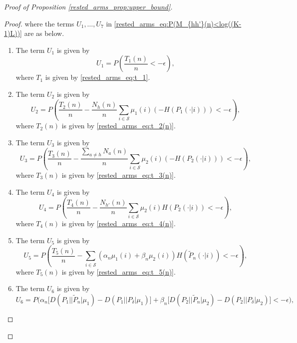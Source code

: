 \begin{proof}[Proof of Proposition \ref{rested_arms_prop:upper_bound}]
\begin{proof}
where the terms $U_1,\ldots,U_7$ in \eqref{rested_arms_eq:P(M_{hh'}(n)<log((K-1)L))} are as below.
\begin{enumerate}
	\item The term $U_1$ is given by
	\begin{equation}
		U_1=P\left(\frac{T_1(n)}{n}<-\epsilon\right)\label{rested_arms_eq:exp_bound_t_1/n},
	\end{equation}
	where $T_1$ is given by \eqref{rested_arms_eq:t_1}.
	\item The term $U_2$ is given by
	\begin{equation}
		U_2=P\left(\frac{T_2(n)}{n}-\frac{N_h(n)}{n}\sum\limits_{i\in\mathcal{S}}\mu_1(i)(-H(P_1(\cdot|i)))<-\epsilon\right)\label{rested_arms_eq:exp_bound_t_2(n)/n},
	\end{equation}
	where $T_2(n)$ is given by \eqref{rested_arms_eq:t_2(n)}.
    \item The term $U_3$ is given by
    \begin{equation}
    	U_3=P\left(\frac{T_3(n)}{n}-\frac{\sum\limits_{a\neq h}N_a(n)}{n}\sum\limits_{i\in\mathcal{S}}\mu_2(i)(-H(P_2(\cdot|i)))<-\epsilon\right)\label{rested_arms_eq:exp_bound_t_3(n)/n},
    \end{equation}
    where $T_3(n)$ is given by \eqref{rested_arms_eq:t_3(n)}.
    \item The term $U_4$ is given by
    \begin{equation}
    	U_4=P\left(\frac{T_4(n)}{n}-\frac{N_{h'}(n)}{n}\sum\limits_{i\in\mathcal{S}}\mu_2(i)H(P_2(\cdot|i))<-\epsilon\right)\label{rested_arms_eq:exp_bound_t_4(n)/n},
    \end{equation}
    where $T_4(n)$ is given by \eqref{rested_arms_eq:t_4(n)}.
    \item The term $U_5$ is given by
    \begin{equation}
    	U_5=P\left(\frac{T_5(n)}{n}-\sum\limits_{i\in\mathcal{S}}(\alpha_n\mu_1(i)+\beta_n\mu_2(i))H(\tilde{P}_n(\cdot|i))<-\epsilon\right)\label{rested_arms_eq:exp_bound_t_5(n)/n},
    \end{equation}
    where $T_5(n)$ is given by \eqref{rested_arms_eq:t_5(n)}.
    \item The term $U_6$ is given by
    \begin{equation}
    	U_6=P\bigg(\alpha_n \bigg[D(P_1||\tilde{P}_n|\mu_1)-D(P_1||P_\delta|\mu_1)\bigg]+\beta_n \bigg[D(P_2||\tilde{P}_n|\mu_2)-D(P_2||P_\delta|\mu_2)\bigg]<-\epsilon\bigg),\label{rested_arms_eq:exp_bound_t_6}
    \end{equation}

\end{enumerate}
\end{proof}
\end{proof}
